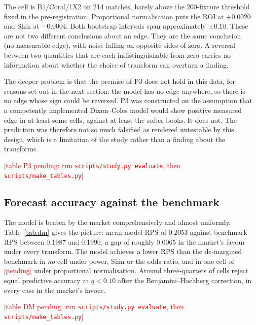 \documentclass[11pt,a4paper]{article}
\newcommand{\inputtable}[1]{%
  {\small\setlength{\tabcolsep}{4.5pt}}%
}
\newcommand{\inputwidetable}[1]{%
  \begingroup
  \small\setlength{\tabcolsep}{4pt}%
  \sbox{0}{}%
  \ifdim\wd0>\linewidth
    \resizebox{\linewidth}{!}{\usebox{0}}%
  \else
    \usebox{0}%
  \fi
  \endgroup
}
\newcommand{\TBD}{\textcolor{red}{[pending]}}
\newcommand{\pendingtable}[1]{%
  \begin{center}\textcolor{red}{[table #1 pending: run \texttt{scripts/study.py evaluate},
  then \texttt{scripts/make\_tables.py}]}\end{center}}
\providecommand{\NCells}{\TBD}
\begin{document}
The cell is B1/Coral/1X2 on 214 matches, barely above the 200-fixture
threshold fixed in the pre-registration. Proportional normalisation puts the
ROI at $+0.0020$ and Shin at $-0.0004$. Both bootstrap intervals span
approximately $\pm 0.10$. These are not two different conclusions about an
edge. They are the same conclusion (no measurable edge), with noise falling on
opposite sides of zero. A reversal between two quantities that are each
indistinguishable from zero carries no information about whether the choice of
transform can overturn a finding.

The deeper problem is that the premise of P3 does not hold in this data, for
reasons set out in the next section: the model has no edge anywhere, so there
is no edge whose sign could be reversed. P3 was constructed on the assumption
that a competently implemented Dixon--Coles model would show positive measured
edge in at least some cells, against at least the softer books. It does not.
The prediction was therefore not so much falsified as rendered untestable by
this design, which is a limitation of the study rather than a finding about
the transforms.

\begin{table}[ht]
  \centering
  \caption{The one cell in which the sign of measured ROI differs across
  transforms.}
  \label{tab:p3}
    {\inputtable{generated/tab-p3.tex}}
    {\pendingtable{P3}}
\end{table}

\subsection{Forecast accuracy against the benchmark}

The model is beaten by the market comprehensively and almost uniformly.
Table~\ref{tab:dm} gives the picture: mean model RPS of 0.2053 against
benchmark RPS between 0.1987 and 0.1990, a gap of roughly 0.0065 in the
market's favour under every transform. The model achieves a lower RPS than the
de-margined benchmark in \emph{no} cell under power, Shin or the odds ratio,
and in one cell of \NCells{} under proportional normalisation. Around
three-quarters of cells reject equal predictive accuracy at $q<0.10$ after the
Benjamini--Hochberg correction, in every case in the market's favour.

\begin{table}[ht]
  \centering
  \caption{Model versus benchmark RPS by transform, with Diebold--Mariano
  statistics and Benjamini--Hochberg adjusted $p$-values.}
  \label{tab:dm}
    {\inputwidetable{generated/tab-dm.tex}}
    {\pendingtable{DM}}
\end{table}
\end{document}
